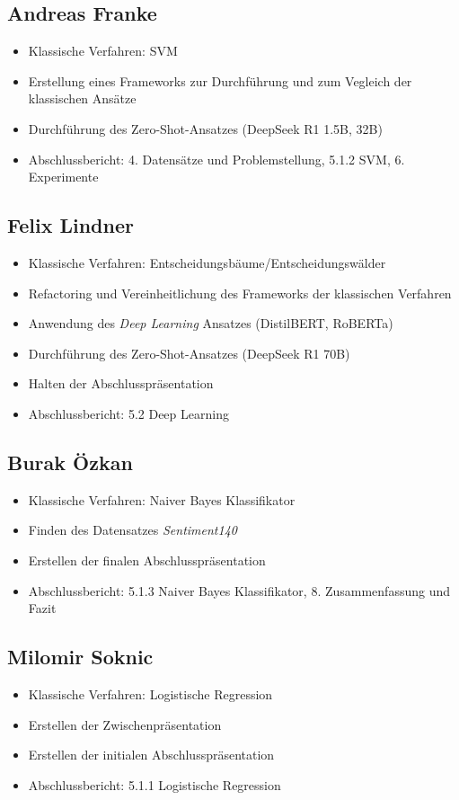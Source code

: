 \begin{multicols}{2}
\subsection{Andreas Franke}
\begin{itemize}
    \item Klassische Verfahren: SVM
    \item Erstellung eines Frameworks zur Durchführung und zum Vegleich der klassischen Ansätze
    \item Durchführung des Zero-Shot-Ansatzes (DeepSeek R1 1.5B, 32B)
    \item Abschlussbericht: 4. Datensätze und Problemstellung, 5.1.2 SVM, 6. Experimente
\end{itemize}

\subsection{Felix Lindner}
\begin{itemize}
    \item Klassische Verfahren: Entscheidungsbäume/Entscheidungswälder
    \item Refactoring und Vereinheitlichung des Frameworks der klassischen Verfahren
    \item Anwendung des \textit{Deep Learning} Ansatzes (DistilBERT, RoBERTa)
    \item Durchführung des Zero-Shot-Ansatzes (DeepSeek R1 70B)
    \item Halten der Abschlusspräsentation
    \item Abschlussbericht: 5.2 Deep Learning
\end{itemize}

\subsection{Burak Özkan}
\begin{itemize}
    \item Klassische Verfahren: Naiver Bayes Klassifikator
    \item Finden des Datensatzes \textit{Sentiment140}
    \item Erstellen der finalen Abschlusspräsentation
    \item Abschlussbericht: 5.1.3 Naiver Bayes Klassifikator, 8. Zusammenfassung und Fazit
\end{itemize}

\subsection{Milomir Soknic}
\begin{itemize}
    \item Klassische Verfahren: Logistische Regression
    \item Erstellen der Zwischenpräsentation
    \item Erstellen der initialen Abschlusspräsentation
    \item Abschlussbericht: 5.1.1 Logistische Regression
\end{itemize}

\end{multicols}
